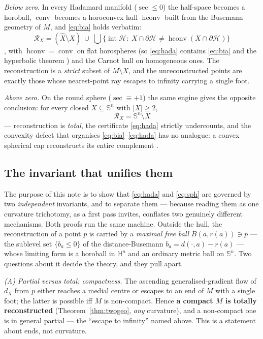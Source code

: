 \documentclass[11pt]{article}
\theoremstyle{remark}
\newcommand{\X}{X}
\newcommand{\Xhat}{\widehat{\X}}
\newcommand{\Rx}{\mathcal{R}_{\X}}
\newcommand{\Hb}[1]{\mathcal{H}_{#1}}
\newcommand{\conv}{\operatorname{conv}}
\newcommand{\hconv}{\operatorname{hconv}}
\newcommand{\sect}{\operatorname{sec}}
\newcommand{\HH}{\mathbb{H}}
\newcommand{\Sn}{\mathbb{S}^{n}}
\begin{document}
\emph{Below zero.} In every Hadamard manifold ($\sect\le0$) the half-space
becomes a horoball, $\conv$ becomes a horoconvex hull $\hconv$ built from
the Busemann geometry of $M$, and \eqref{eq:bia} holds verbatim:
\begin{equation}\label{eq:hada}
  \Rx=(\Xhat\setminus\X)\ \cup\
  \bigcup\bigl\{\operatorname{int}\Hb{}:\ \X\cap\partial\Hb{}\neq
  \hconv(\X\cap\partial\Hb{})\bigr\}
\end{equation}
\cite[Thm.~3.3--3.4]{R3}, with $\hconv=\conv$ on flat horospheres (so
\eqref{eq:hada} contains \eqref{eq:bia} and the hyperbolic theorem
\cite{R2}) and the Carnot hull on homogeneous ones. The reconstruction is
a \emph{strict} subset of $M\setminus\X$, and the unreconstructed points
are exactly those whose nearest-point ray escapes to infinity carrying a
single foot.

\emph{Above zero.} On the round sphere ($\sect\equiv+1$) the same engine
gives the opposite conclusion: for every closed $\X\subseteq\Sn$ with
$|\X|\ge2$,
\begin{equation}\label{eq:sph}
  \Rx=\Sn\setminus\X
\end{equation}
\cite[Thm.~4.1]{Sph} --- reconstruction is \emph{total}, the certificate
\eqref{eq:hada} strictly undercounts, and the convexity defect that
organises \eqref{eq:bia}--\eqref{eq:hada} has no analogue: a convex
spherical cap reconstructs its entire complement
\cite[Prop.~5.1]{Sph}.

\subsection*{The invariant that unifies them}

The purpose of this note is to show that \eqref{eq:hada} and \eqref{eq:sph}
are governed by two \emph{independent} invariants, and to separate them ---
because reading them as one curvature trichotomy, as a first pass invites,
conflates two genuinely different mechanisms. Both proofs run the same
machine. Outside the hull, the reconstruction of a point $p$ is carried by
a \emph{maximal free ball} $B(a,r(a))\ni p$ --- the sublevel set
$\{b_{a}\le0\}$ of the distance-Busemann $b_{a}=d(\cdot,a)-r(a)$ --- whose
limiting form is a horoball in $\HH^{n}$ and an ordinary metric ball on
$\Sn$. Two questions about it decide the theory, and they pull apart.

\smallskip\noindent\emph{(A) Partial versus total: compactness.} The
ascending generalised-gradient flow of $d_{\X}$ from $p$ either reaches a
medial centre or escapes to an end of $M$ with a single foot; the latter is
possible iff $M$ is non-compact. Hence \textbf{a compact $M$ is totally
reconstructed} (Theorem~\ref{thm:twogeo}, \emph{any} curvature), and a
non-compact one is in general partial --- the ``escape to infinity'' named
above. This is a statement about ends, not curvature.
\end{document}
